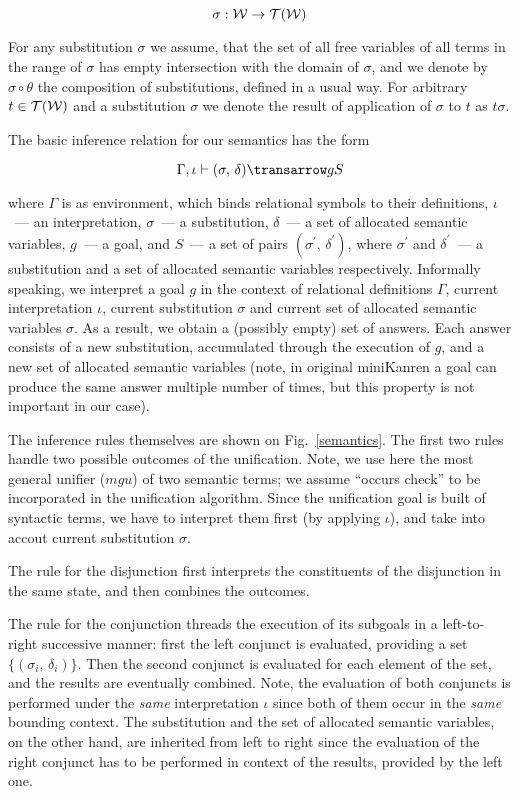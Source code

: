 $$
\sigma : {\cal{W}} \to {\cal{T}}({\cal{W}})
$$

For any substitution $\sigma$ we assume, that the set of all free variables of all terms in the range of $\sigma$ has empty intersection with the
domain of $\sigma$, and we denote by $\sigma\circ\theta$ the composition of substitutions, defined in a usual way. For arbitrary $t\in{\cal{T}}({\cal{W}})$ and
a substitution $\sigma$ we denote the result of application of $\sigma$ to $t$ as $t\sigma$.

The basic inference relation for our semantics has the form

$$
\otrans{\Gamma,\iota}{(\sigma,\,\delta)}{g}{S}
$$

\noindent where $\Gamma$ is as environment, which binds relational symbols to their definitions, $\iota$~--- an interpretation, $\sigma$~--- a substitution, 
$\delta$~--- a set of allocated semantic variables, $g$~--- a goal, and $S$~--- a set of pairs $(\sigma^\prime,\,\delta^\prime)$, where $\sigma^\prime$ and
$\delta^\prime$~--- a substitution and a set of allocated semantic variables respectively. Informally speaking, we interpret a goal $g$ in the context of
relational definitions $\Gamma$, current interpretation $\iota$, current substitution $\sigma$ and current set of allocated semantic variables $\sigma$. As a 
result, we obtain a (possibly empty) set of answers. Each answer consists of a new substitution, accumulated through the execution of $g$, and a new set of
allocated semantic variables (note, in original miniKanren a goal can produce the same answer multiple number of times, but this property is not important
in our case).

The inference rules themselves are shown on Fig.~\ref{semantics}. The first two rules handle two possible outcomes of the unification. Note, we use here the most 
general unifier ($mgu$) of two semantic terms; we assume ``occurs check'' to be incorporated in the unification algorithm. Since the unification goal is built of 
syntactic terms, we have to interpret them first (by applying $\iota$), and take into accout current substitution $\sigma$.

The rule for the disjunction first interprets the constituents of the disjunction in the same state, and then combines the outcomes.

The rule for the conjunction threads the execution of its subgoals in a left-to-right successive manner: first the
left conjunct is evaluated, providing a set $\{(\sigma_i,\,\delta_i)\}$. Then the second conjunct is evaluated for each element of the set, and the
results are eventually combined. Note, the evaluation of both conjuncts is performed under the \emph{same} interpretation $\iota$ since both of them occur in the 
\emph{same} bounding context. The substitution and the set of allocated semantic variables, on the other hand, are inherited from left to right since the evaluation 
of the right conjunct has to be performed in context of the results, provided by the left one. 

